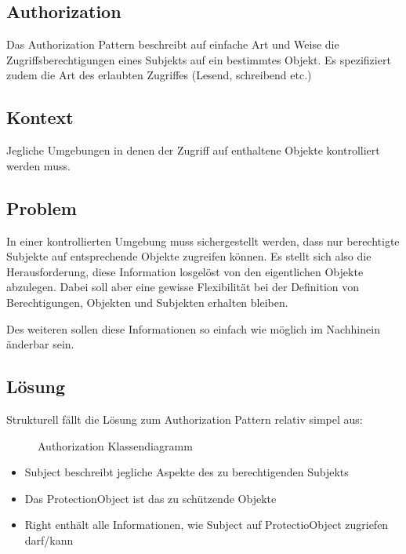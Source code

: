 \subsection{Authorization}

Das Authorization Pattern beschreibt auf einfache Art und Weise die Zugriffsberechtigungen eines Subjekts auf ein bestimmtes Objekt. Es spezifiziert zudem die Art des erlaubten Zugriffes (Lesend, schreibend etc.)

\subsection*{Kontext}
Jegliche Umgebungen in denen der Zugriff auf enthaltene Objekte kontrolliert werden muss.

\subsection*{Problem}
In einer kontrollierten Umgebung muss sichergestellt werden, dass nur berechtigte Subjekte auf entsprechende Objekte zugreifen können. Es stellt sich also die Herausforderung, diese Information losgelöst von den eigentlichen Objekte abzulegen. Dabei soll aber eine gewisse Flexibilität bei der Definition von Berechtigungen, Objekten und Subjekten erhalten bleiben.

Des weiteren sollen diese Informationen so einfach wie möglich im Nachhinein änderbar sein.

\subsection*{Lösung}
Strukturell fällt die Lösung zum Authorization Pattern relativ simpel aus:

\begin{figure}[H]
	\begin{center}
	\end{center}
\caption{Authorization Klassendiagramm}
\end{figure}

\begin{itemize}
	\item Subject beschreibt jegliche Aspekte des zu berechtigenden Subjekts
	\item Das ProtectionObject ist das zu schützende Objekte
	\item Right enthält alle Informationen, wie Subject auf ProtectioObject zugriefen darf/kann
\end{itemize}

